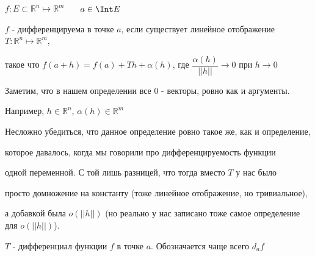 \begin{definition} \thmslashn

    $f: E \subset \mathbb{R}^n \mapsto \mathbb{R}^m$ \ \ \ $a \in \Int E$

    $f$ - дифференцируема в точке $a$, если существует линейное отображение $T: \mathbb{R}^n \mapsto \mathbb{R}^m$,

    такое что $f(a + h) = f(a) + Th + \alpha(h)$, где $\dfrac{\alpha(h)}{||h||} \rightarrow 0$ при $h \rightarrow 0$

\end{definition}

\begin{remark} \thmslashn

    Заметим, что в нашем определении все 0 - векторы, ровно как и аргументы. 

    Например, $h \in \mathbb{R}^n$, $\alpha(h) \in \mathbb{R}^m$

\end{remark}

\begin{remark} \thmslashn

    Несложно убедиться, что данное определение ровно такое же, как и определение,

    которое давалось, когда мы говорили про дифференцируемость функции

    одной переменной. С той лишь разницей, что тогда вместо $T$  у нас было 

    просто домножение на константу (тоже линейное отображение, но тривиальное),

    а добавкой была $o(||h||)$ (но реально у нас записано тоже самое определение для $o(||h||)$). 

\end{remark}

\begin{definition} \thmslashn

    $T$ - дифференциал функции $f$ в точке $a$. Обозначается чаще всего $d_af$

\end{definition}

